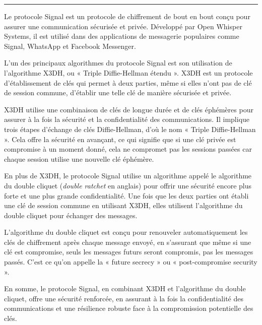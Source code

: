 \hrule
Le protocole Signal est un protocole de chiffrement de bout en bout conçu pour assurer une communication sécurisée et privée. Développé par Open Whisper Systems, il est utilisé dans des applications de messagerie populaires comme Signal, WhatsApp et Facebook Messenger.\par

L'un des principaux algorithmes du protocole Signal est son utilisation de l'algorithme X3DH, ou « Triple Diffie-Hellman étendu ». X3DH est un protocole d'établissement de clés qui permet à deux parties, même si elles n'ont pas de clé de session commune, d'établir une telle clé de manière sécurisée et privée.\par

X3DH utilise une combinaison de clés de longue durée et de clés éphémères pour assurer à la fois la sécurité et la confidentialité des communications. Il implique trois étapes d’échange de clés Diffie-Hellman, d’où le nom « Triple Diffie-Hellman ». Cela offre la sécurité en avançant, ce qui signifie que si une clé privée est compromise à un moment donné, cela ne compromet pas les sessions passées car chaque session utilise une nouvelle clé éphémère.\par

En plus de X3DH, le protocole Signal utilise un algorithme appelé le algorithme du double cliquet (\emph{double ratchet} en anglais) pour offrir une sécurité encore plus forte et une plus grande confidentialité. Une fois que les deux parties ont établi une clé de session commune en utilisant X3DH, elles utilisent l'algorithme du double cliquet pour échanger des messages.\par

L'algorithme du double cliquet est conçu pour renouveler automatiquement les clés de chiffrement après chaque message envoyé, en s'assurant que même si une clé est compromise, seuls les messages futurs seront compromis, pas les messages passés. C'est ce qu'on appelle la « future secrecy » ou  « post-compromise security ».

En somme, le protocole Signal, en combinant X3DH et l'algorithme du double cliquet, offre une sécurité renforcée, en assurant à la fois la confidentialité des communications et une résilience robuste face à la compromission potentielle des clés.




\label{sec:accreditations}



